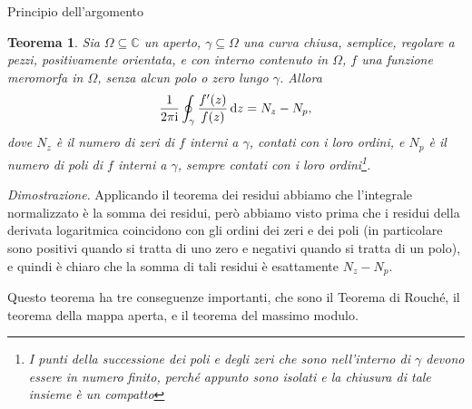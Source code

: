 \documentclass[11pt]{book}
\makeatletter
\theoremstyle{Definizione}
\theoremstyle{TeoremaProposizioneLemmaCorollarioCongettura}
\newtheorem{myteo}{Teorema}[section]
\theoremstyle{OsservazioneNotaEsempio}
\renewenvironment{proof}[1][\proofname]{\par
  \normalfont \topsep6\p@\@plus6\p@\relax
  \trivlist
  \item[\hskip\labelsep
        \itshape
    #1\@addpunct{.}]\ignorespaces
}{%
  \endtrivlist\@endpefalse
}
\renewenvironment{proof}{\textsl{Dimostrazione}.}{}
\newcommand{\C}{\mathbb{C}}
\renewcommand{\i}{\textup{i}}
\renewcommand{\d}{\mathrm{d}}
\newcommand{\dz}{\,\d z}
\makeatother
\begin{document}
\begin{boxteo}{Principio dell'argomento}
\begin{myteo}\label{teo:PrincipioDellArgomento}
Sia $\Omega\subseteq \C$ un aperto, $\gamma \subseteq \Omega$ una curva chiusa, semplice, regolare a pezzi, positivamente orientata, e con interno contenuto in $\Omega$, $f$ una funzione meromorfa in $\Omega$, senza alcun polo o zero lungo $\gamma$. Allora
$$
\frac{1}{2\pi\i}\oint_\gamma \frac{f'(z)}{f(z)}\dz = N_z-N_p,
$$
dove $N_z$ è il numero di zeri di $f$ interni a $\gamma$, contati con i loro ordini, e $N_p$ è il numero di poli di $f$ interni a $\gamma$, sempre contati con i loro ordini\footnote[1]{I punti della successione dei poli e degli zeri che sono nell'interno di $\gamma$ devono essere in numero finito, perché appunto sono isolati e la chiusura di tale insieme è un compatto}.
\end{myteo}
\tcblower
\begin{proof}
Applicando il teorema dei residui abbiamo che l'integrale normalizzato è la somma dei residui, però abbiamo visto prima che i residui della derivata logaritmica coincidono con gli ordini dei zeri e dei poli (in particolare sono positivi quando si tratta di uno zero e negativi quando si tratta di un polo), e quindi è chiaro che la somma di tali residui è esattamente $N_z-N_p$. \end{proof}
\end{boxteo}
\noindent
Questo teorema ha tre conseguenze importanti, che sono il Teorema di Rouché, il teorema della mappa aperta, e il teorema del massimo modulo.
\end{document}
